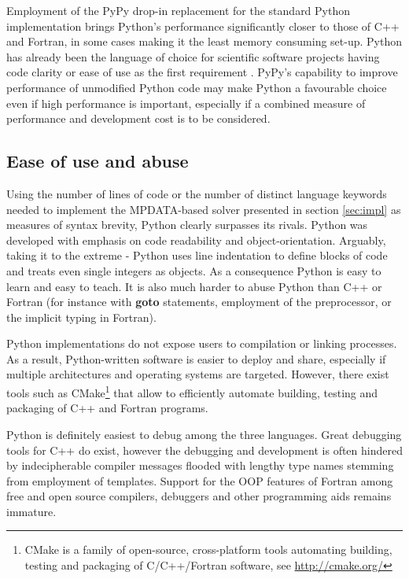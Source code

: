 \documentclass[twocolumn]{article}
\newcommand{\prog}[1]{{\rm\bf#1}}
\begin{document}
  Employment of the PyPy drop-in replacement for the standard Python implementation brings 
    Python's performance significantly closer to those of C++ and Fortran, in some
    cases making it the least memory consuming set-up.
  Python has already been the language of choice for scientific software projects having code clarity 
    or ease of use as the first requirement \citep[see e.g.][]{Barnes_and_Jones_2011}.
  PyPy's capability to improve performance of unmodified Python code may 
    make Python a favourable choice even if high performance is important, especially
    if a combined measure of performance and development cost is to be considered. 

  \subsection{Ease of use and abuse}

  Using the number of lines of code or the number of distinct language keywords
    needed to implement the MPDATA-based
    solver presented in section \ref{sec:impl} as measures of syntax 
    brevity, Python clearly surpasses its rivals.
  Python was developed with emphasis on code readability and object-orientation.
  Arguably, taking it to the extreme - Python uses line indentation to define 
    blocks of code and treats even single integers as objects.
  As a consequence Python is easy to learn and easy to teach.
  It is also much harder to abuse Python than C++ or Fortran
    (for instance with \prog{goto} statements, employment of the preprocessor,
    or the implicit typing in Fortran).

  Python implementations do not expose users to compilation or linking processes. 
  As a result, Python-written software is easier to deploy and share, especially 
    if multiple architectures and operating systems are targeted.
  However, there exist tools such as CMake\footnote{CMake is a family of open-source, cross-platform
    tools automating building, testing and packaging of C/C++/Fortran software,
    see \url{http://cmake.org/}}
    that allow to efficiently automate 
    building, testing and packaging of C++ and Fortran programs.

  Python is definitely easiest to debug among the three languages.
  Great debugging tools for C++ do exist, however the debugging and development is 
    often hindered by indecipherable compiler messages
    flooded with lengthy type names stemming from employment of templates.
  Support for the OOP features of Fortran among free and open source compilers, 
    debuggers and other programming aids remains immature.
    
\end{document}

